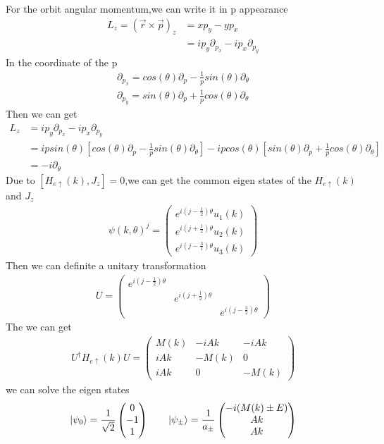 \documentclass[4pt]{article}
\begin{document}
For the orbit angular momentum,we can write it in p appearance
\begin{align}
	L_z=(\vec{r}\times\vec{p})_z&=xp_y-yp_x\\
	&=ip_y\partial_{p_x}-ip_x\partial_{p_y}
\end{align}
	In the coordinate of the p 
	\begin{align}
		\partial_{p_x}=cos(\theta)\partial_{p}-\frac{1}{p}sin(\theta)\partial_{\theta}\\
		\partial_{p_y}=sin(\theta)\partial_{p}+\frac{1}{p}cos(\theta)\partial_{\theta}
	\end{align}
Then we can get 
\begin{align}
	L_z&=ip_y\partial_{p_x}-ip_x\partial_{p_y}\\
	&=ipsin(\theta)[cos(\theta)\partial_{p}-\frac{1}{p}sin(\theta)\partial_{\theta}]-ipcos(\theta)	[sin(\theta)\partial_{p}+\frac{1}{p}cos(\theta)\partial_{\theta}]\\
	&=-i\partial_{\theta}
\end{align}
Due to $[H_{e\uparrow}(k),J_z]=0$,we can get the common eigen states of the $H_{e\uparrow}(k)$ and $J_z$
\begin{align}
	\psi(k,\theta)^j=
	\begin{pmatrix}
			e^{i(j-\frac{1}{2})\theta}u_1(k)\\
			e^{i(j+\frac{1}{2})\theta}u_2(k)\\
			e^{i(j-\frac{3}{1})\theta}u_3(k)
	\end{pmatrix}
\end{align}	
	Then we can definite a unitary transformation
	\begin{align}
		U=
		\begin{pmatrix}
			e^{i(j-\frac{1}{2})\theta}&&\\
			&e^{i(j+\frac{1}{2})\theta}&\\
			&&e^{i(j-\frac{3}{2})\theta}
		\end{pmatrix}
	\end{align}
The we can get 
\begin{align}
	U^{\dagger}H_{e\uparrow}(k)U=
	\begin{pmatrix}
		M(k)&-iAk&-iAk\\
		iAk&-M(k)&0\\
		iAk&0&-M(k)
	\end{pmatrix}
\end{align}
	we can solve the eigen states
	\begin{align}
		\ket{\psi_0}=\frac{1}{\sqrt{2}}
		\begin{pmatrix}
			0\\
			-1\\
			1
		\end{pmatrix}
	\qquad
		\ket{\psi_{\pm}}=\frac{1}{a_{\pm}}
		\begin{pmatrix}
			-i(M(k)\pm E)\\
			Ak\\
			Ak
		\end{pmatrix}
	\end{align}
\end{document}
